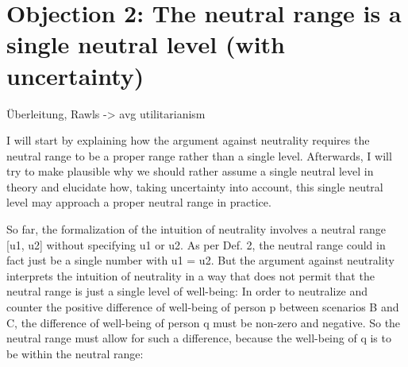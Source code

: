 \chapter{Objection 2: The neutral range is a single neutral level (with uncertainty)}

Überleitung, Rawls -{\textgreater} avg utilitarianism 

I will start by explaining how the argument against neutrality requires the neutral range to be a proper range rather than a single level. Afterwards, I will try to make plausible why we should rather assume a single neutral level in theory and elucidate how, taking uncertainty into account, this single neutral level may approach a proper neutral range in practice.  

So far, the formalization of the intuition of neutrality involves a neutral range [u1, u2] without specifying u1 or u2. As per Def. 2, the neutral range could in fact just be a single number with u1 = u2. But the argument against neutrality interprets the intuition of neutrality in a way that does not permit that the neutral range is just a single level of well-being: In order to neutralize and counter the positive difference of well-being of person p between scenarios B and C, the difference of well-being of person q must be non-zero and negative. So the neutral range must allow for such a difference, because the well-being of q is to be within the neutral range:  
\begin{comment}
\begin{flushleft} \tablefirsthead{} \tablehead{} \tabletail{} \tablelasttail{} \begin{supertabular}{m{1.201cm}m{13.639cm}} (C10) & (A2) \ \ ${\wedge}$ (A3) \ $\Rightarrow $ \ uB(p) {\textgreater} uC(p)\\ (C11) & (C10) ${\wedge}$ (A5) \ $\Rightarrow $ \ uB(q) {\textless} uC(q)\\ (C12) & (C11) ${\wedge}$ (A4) \ $\Rightarrow $ \ u1 {\textless} u2\\ \end{supertabular} \end{flushleft} Formally (C12), as an implication of the argument against neutrality, is a substantive specification of the intuition of neutrality. But contentwise (C12) is completely in line with the idea behind the intuition of neutrality (cf. \label{ref:RND8nKulQFNSj}Broome 2004, p. 146): Added lives are neutral except if they are at a very low or very high level of well-being (\label{ref:RNDjFXco5Qn80}Broome 2012, p. 172), so the neutral range is not only a proper range but also a rather big range.  
\end{comment}
